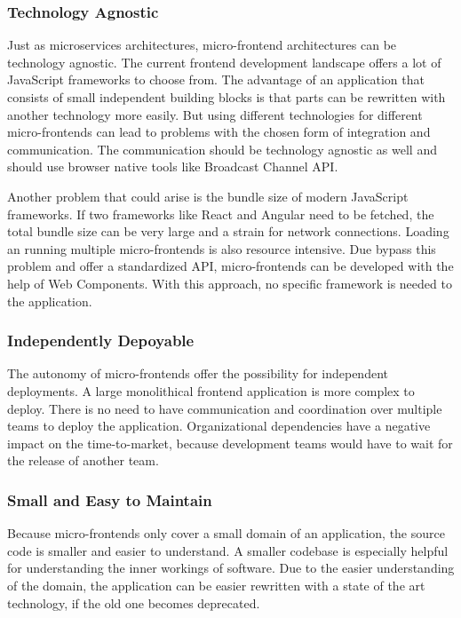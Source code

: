 \subsubsection{Technology Agnostic}

Just as microservices architectures, micro-frontend architectures can be technology agnostic. The current frontend development landscape offers a lot of JavaScript frameworks to choose from. The advantage of an application that consists of small independent building blocks is that parts can be rewritten with another technology more easily. \cite{book:2020:geers:background:micro-frontends:micro-frontends-in-action} But using different technologies for different micro-frontends can lead to problems with the chosen form of integration and communication. The communication should be technology agnostic as well and should use browser native tools like Broadcast Channel API.

Another problem that could arise is the bundle size of modern JavaScript frameworks. If two frameworks like React and Angular need to be fetched, the total bundle size can be very large and a strain for network connections. Loading an running multiple micro-frontends is also resource intensive. Due bypass this problem and offer a standardized API, micro-frontends can be developed with the help of Web Components. With this approach, no specific framework is needed to the application. \cite{book:2020:geers:background:micro-frontends:micro-frontends-in-action} 

\subsubsection{Independently Depoyable}

The autonomy of micro-frontends offer the possibility for independent deployments. A large monolithical frontend application is more complex to deploy. There is no need to have communication and coordination over multiple teams to deploy the application. Organizational dependencies have a negative impact on the time-to-market, because development teams would have to wait for the release of another team. \cite{book:2020:geers:background:micro-frontends:micro-frontends-in-action} 

\subsubsection{Small and Easy to Maintain}

Because micro-frontends only cover a small domain of an application, the source code is smaller and easier to understand. A smaller codebase is especially helpful for understanding the inner workings of software. 
Due to the easier understanding of the domain, the application can be easier rewritten with a state of the art technology, if the old one becomes deprecated. \cite{book:2020:geers:background:micro-frontends:micro-frontends-in-action}

